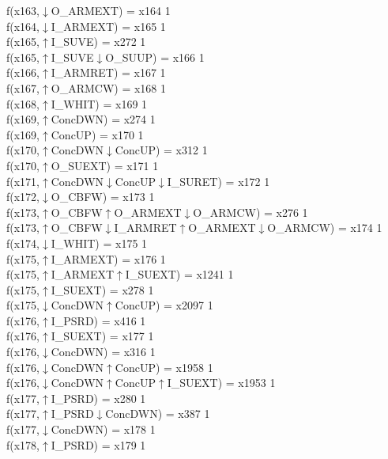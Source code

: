 f(x163,$\downarrow$O\_ARMEXT) = x164 {1} \\
f(x164,$\downarrow$I\_ARMEXT) = x165 {1} \\
f(x165,$\uparrow$I\_SUVE) = x272 {1} \\
f(x165,$\uparrow$I\_SUVE$\downarrow$O\_SUUP) = x166 {1} \\
f(x166,$\uparrow$I\_ARMRET) = x167 {1} \\
f(x167,$\uparrow$O\_ARMCW) = x168 {1} \\
f(x168,$\uparrow$I\_WHIT) = x169 {1} \\
f(x169,$\uparrow$ConcDWN) = x274 {1} \\
f(x169,$\uparrow$ConcUP) = x170 {1} \\
f(x170,$\uparrow$ConcDWN$\downarrow$ConcUP) = x312 {1} \\
f(x170,$\uparrow$O\_SUEXT) = x171 {1} \\
f(x171,$\uparrow$ConcDWN$\downarrow$ConcUP$\downarrow$I\_SURET) = x172 {1} \\
f(x172,$\downarrow$O\_CBFW) = x173 {1} \\
f(x173,$\uparrow$O\_CBFW$\uparrow$O\_ARMEXT$\downarrow$O\_ARMCW) = x276 {1} \\
f(x173,$\uparrow$O\_CBFW$\downarrow$I\_ARMRET$\uparrow$O\_ARMEXT$\downarrow$O\_ARMCW) = x174 {1} \\
f(x174,$\downarrow$I\_WHIT) = x175 {1} \\
f(x175,$\uparrow$I\_ARMEXT) = x176 {1} \\
f(x175,$\uparrow$I\_ARMEXT$\uparrow$I\_SUEXT) = x1241 {1} \\
f(x175,$\uparrow$I\_SUEXT) = x278 {1} \\
f(x175,$\downarrow$ConcDWN$\uparrow$ConcUP) = x2097 {1} \\
f(x176,$\uparrow$I\_PSRD) = x416 {1} \\
f(x176,$\uparrow$I\_SUEXT) = x177 {1} \\
f(x176,$\downarrow$ConcDWN) = x316 {1} \\
f(x176,$\downarrow$ConcDWN$\uparrow$ConcUP) = x1958 {1} \\
f(x176,$\downarrow$ConcDWN$\uparrow$ConcUP$\uparrow$I\_SUEXT) = x1953 {1} \\
f(x177,$\uparrow$I\_PSRD) = x280 {1} \\
f(x177,$\uparrow$I\_PSRD$\downarrow$ConcDWN) = x387 {1} \\
f(x177,$\downarrow$ConcDWN) = x178 {1} \\
f(x178,$\uparrow$I\_PSRD) = x179 {1} \\
